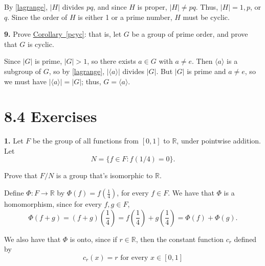 \documentclass[10pt,]{book}
\theoremstyle{plain}
\theoremstyle{definition}
\theoremstyle{definition}
\theoremstyle{definition}
\theoremstyle{definition}
\numberwithin{equation}{section}
\def\R{\mathbb{R}}
\begin{document}
      By \hyperref[lagrange]{\ref{lagrange}}, \(|H|\) divides \(pq\), and since \(H\) is proper, \(|H|\neq  pq\).
      Thus, \(|H|=1,p\), or \(q\). Since the order of \(H\) is
      either 1 or a prime number, \(H\) must be cyclic.
\par\smallskip
\noindent\textbf{9.}\quad{}
        Prove \hyperref[pcyc]{Corollary~\ref{pcyc}}: that is, let \(G\) be a group of prime order, and prove that \(G\) is cyclic.
\par\smallskip

      Since \(|G|\) is prime, \(|G|>1\), so there exists \(a\in G\)
      with \(a\neq e\). Then \(\langle a\rangle\) is a subgroup of \(G\), so by
      \hyperref[lagrange]{\ref{lagrange}}, \(|\langle a\rangle |\) divides \(|G|\). But \(|G|\) is
      prime and \(a\neq e\), so we must have \(|\langle a\rangle |=|G|\); thus,
      \(G=\langle a\rangle\).
\par\smallskip
\section*{8.4 Exercises}
\noindent\textbf{1.}\quad{}
        Let \(F\) be the group of all functions from \([0,1]\) to
        \(\R\), under pointwise addition. Let
\begin{equation*}

          N=\{f\in F:
          f(1/4)=0\}.
        
\end{equation*}

\par

        Prove that \(F/N\) is a group that's
        isomorphic to \(\R\).
\par\smallskip

      Define \(\Phi:F\rightarrow \R\) by
      \(\Phi(f)=f\left(\frac{1}{4}\right)\), for every \(f\in F\). We have
      that \(\Phi\) is a homomorphism, since for every \(f, g\in F\),
\begin{equation*}

        \Phi(f+g)=(f+g)\left(\frac{1}{4}\right)=f\left(\frac{1}{4}\right)+g\left(\frac{1}{4}\right)=\Phi(f)+\Phi(g).
      
\end{equation*}

\par

      We also have that \(\Phi\) is onto, since if \(r\in \R\), then the
      constant function \(c_r\) defined by
\begin{equation*}

        c_r(x)=r \mbox{ for every \(x\in
        [0,1]\)}
      
\end{equation*}
\end{document}
